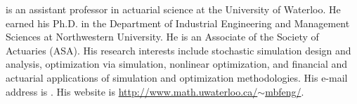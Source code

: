 \documentclass{wscpaperproc}
\theoremstyle{wsc}
\begin{document}
 is an assistant professor in actuarial science at the University of Waterloo. He earned his Ph.D. in the Department of Industrial Engineering and Management Sciences at Northwestern University. He is an Associate of the Society of Actuaries (ASA). His research interests include stochastic simulation design and analysis, optimization via simulation, nonlinear optimization, and financial and actuarial applications of simulation and optimization methodologies. His e-mail address is . His website is \href{http://www.math.uwaterloo.ca/~mbfeng/}{http://www.math.uwaterloo.ca/$\sim$mbfeng/}. \\
\end{document}
